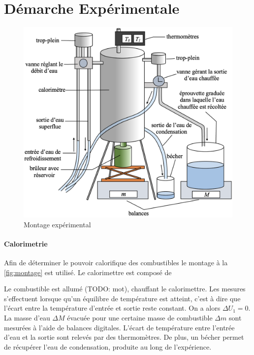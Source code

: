 \section{Démarche Expérimentale}

\begin{figure}
    \centering
    \includegraphics[width=\linewidth]{figures/montage.png}
    \caption{Montage expérimental \cite{rapport-mendels-pascaud}}
    \label{fig:montage}
\end{figure}

\paragraph*{Calorimetrie} Afin de déterminer le pouvoir calorifique des combustibles le montage à la \autoref{fig:montage} est utilisé. Le calorimettre est composé de

Le combustible est allumé (TODO: mot), chauffant le calorimettre. Les mesures s'effectuent lorsque qu'un équilibre de température est atteint, c'est à dire que l'écart entre la température d'entrée et sortie reste constant. On a alors \(\Delta U_1 = 0\). La masse d'eau \(\Delta M\) évacuée pour une certaine masse de combustible \(\Delta m\) sont mesurées à l'aide de balances digitales. L'écart de température entre l'entrée d'eau et la sortie sont relevés par des thermomètres. De plus, un bécher permet de récupérer l'eau de condensation, produite au long de l'expérience.
